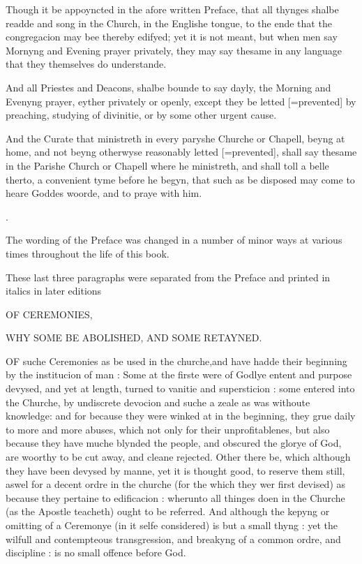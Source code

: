 Though it be appoyncted in the afore written Preface,
that all thynges shalbe readde and song in the Church, in the Englishe
tongue, to the ende that the congregacion may bee thereby edifyed; yet
it is not meant, but when men say Mornyng and Evening prayer privately,
they may say thesame in any language that they themselves do understande.

And all Priestes and Deacons, shalbe bounde to say
dayly, the Morning and Evenyng prayer, eyther privately or openly, except
they be letted [=prevented]
by preaching, studying of divinitie, or by some other urgent cause.

And the Curate that ministreth in every paryshe Churche
or Chapell, beyng at home, and not beyng otherwyse reasonably letted
[=prevented],
shall say thesame in the Parishe Church or Chapell where he ministreth,
and shall toll a belle therto, a convenient tyme before he begyn, that
such as be disposed may come to heare Goddes woorde, and to praye with
him.

.

The
wording of the Preface was changed in a number of minor ways at various
times throughout the life of this book.

These
last three paragraphs were separated from the Preface and printed in italics
in later editions

OF
CEREMONIES,

WHY
SOME BE ABOLISHED, AND SOME RETAYNED.

OF suche Ceremonies as be used
in the churche,and have hadde their beginning by the institucion of
man : Some at the firste were of Godlye entent and purpose devysed,
and yet at length, turned to vanitie and supersticion : some entered
into the Churche, by undiscrete devocion and suche a zeale as was withoute
knowledge: and for because they were winked at in the beginning, they
grue daily to more and more abuses, which not only for their unprofitablenes,
but also because they have muche blynded the people, and obscured the
glorye of God, are woorthy to be cut away, and cleane rejected. Other
there be, which although they have been devysed by manne, yet it is
thought good, to reserve them still, aswel for a decent ordre in the
churche (for the which they wer first devised) as because they pertaine
to edificacion : wherunto all thinges doen in the Churche (as the Apostle
teacheth) ought to be referred. And although the kepyng or omitting
of a Ceremonye (in it selfe considered) is but a small thyng : yet the
wilfull and contempteous transgression, and breakyng of a common ordre,
and discipline : is no small offence before God. 

